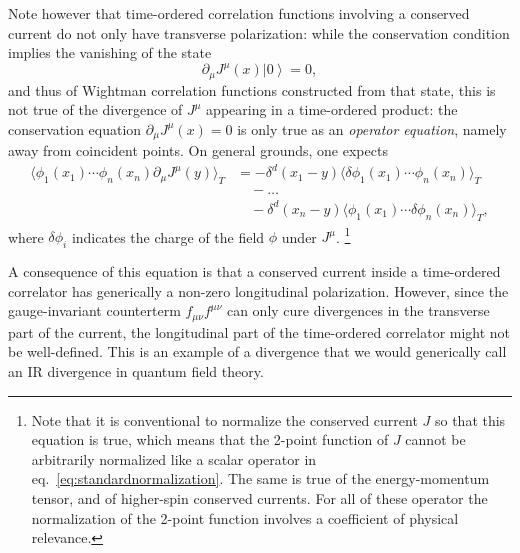 \documentclass[a4paper,12pt]{article}
\newcommand{\ket}[1]{\left| #1 \right\rangle}
\numberwithin{equation}{section}
\begin{document}
Note however that time-ordered correlation functions involving a conserved current do not only have transverse polarization: while the conservation condition implies the vanishing of the state
\begin{equation}
	\partial_\mu J^\mu(x) \ket{0} = 0,
\end{equation}
and thus of Wightman correlation functions constructed from that state, this is not true of the divergence of $J^\mu$ appearing in a time-ordered product: the conservation equation $\partial_\mu J^\mu(x) = 0$ is only true as an \emph{operator equation}, namely away from coincident points. On general grounds, one expects
\begin{align}
	\langle \phi_1(x_1) \cdots \phi_n(x_n)
	\partial_\mu J^\mu(y) \rangle_T
	&= - \delta^d(x_1 - y)
	\langle \delta\phi_1(x_1) \cdots \phi_n(x_n)  \rangle_T
	\nonumber \\
	& \quad - \ldots
	\nonumber \\
	& \quad -\delta^d(x_n - y)
	\langle \phi_1(x_1) \cdots \delta\phi_n(x_n)  \rangle_T,
\end{align}
where $\delta\phi_i$ indicates the charge of the field $\phi$ under $J^\mu$.%
%
\footnote{Note that it is conventional to normalize the conserved current $J$ so that this equation is true, which means that the 2-point function of $J$ cannot be arbitrarily normalized like a scalar operator in eq.~\eqref{eq:standardnormalization}. The same is true of the energy-momentum tensor, and of higher-spin conserved currents. For all of these operator the normalization of the 2-point function involves a coefficient of physical relevance.}
%


A consequence of this equation is that a conserved current inside a time-ordered correlator has generically a non-zero longitudinal polarization. However, since the gauge-invariant counterterm $f_{\mu\nu} f^{\mu\nu}$ can only cure divergences in the transverse part of the current, the longitudinal part of the time-ordered correlator might not be well-defined. This is an example of a divergence that we would generically call an IR divergence in quantum field theory. %




\end{document}
